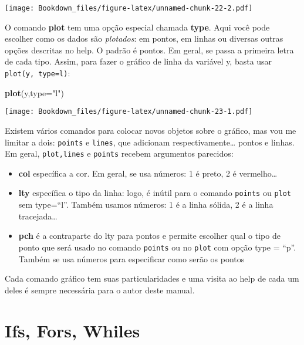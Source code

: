 \documentclass[]{book}
\newenvironment{Shaded}{\begin{snugshade}}{\end{snugshade}}
\newcommand{\KeywordTok}[1]{\textcolor[rgb]{0.13,0.29,0.53}{\textbf{#1}}}
\newcommand{\DataTypeTok}[1]{\textcolor[rgb]{0.13,0.29,0.53}{#1}}
\newcommand{\StringTok}[1]{\textcolor[rgb]{0.31,0.60,0.02}{#1}}
\newcommand{\NormalTok}[1]{#1}
\providecommand{\tightlist}{%
  \setlength{\itemsep}{0pt}\setlength{\parskip}{0pt}}
\begin{document}
\texttt{[image: Bookdown\_files/figure-latex/unnamed-chunk-22-2.pdf]}

O comando \textbf{plot} tem uma opção especial chamada \textbf{type}.
Aqui você pode escolher como os dados são \emph{plotados}: em pontos, em
linhas ou diversas outras opções descritas no help. O padrão é pontos.
Em geral, se passa a primeira letra de cada tipo. Assim, para fazer o
gráfico de linha da variável y, basta usar
\texttt{plot(y,\ type=\textquotesingle{}\textquotesingle{}l\textquotesingle{}\textquotesingle{})}:

\begin{Shaded}
\begin{Highlighting}[]
\KeywordTok{plot}\NormalTok{(y,}\DataTypeTok{type=}\StringTok{"l"}\NormalTok{)}
\end{Highlighting}
\end{Shaded}

\texttt{[image: Bookdown\_files/figure-latex/unnamed-chunk-23-1.pdf]}

Existem vários comandos para colocar novos objetos sobre o gráfico, mas
vou me limitar a dois: \texttt{points} e \texttt{lines}, que adicionam
respectivamente\ldots{} pontos e linhas. Em geral, \texttt{plot,lines} e
\texttt{points} recebem argumentos parecidos:

\begin{itemize}
\tightlist
\item
  \textbf{col} específica a cor. Em geral, se usa números: 1 é preto, 2
  é vermelho\ldots{}
\item
  \textbf{lty} específica o tipo da linha: logo, é inútil para o comando
  \texttt{points} ou \texttt{plot} sem type=``l''. Também usamos
  números: 1 é a linha sólida, 2 é a linha tracejada\ldots{}
\item
  \textbf{pch} é a contraparte do lty para pontos e permite escolher
  qual o tipo de ponto que será usado no comando \texttt{points} ou no
  \texttt{plot} com opção type = ``p''. Também se usa números para
  especificar como serão os pontos
\end{itemize}

Cada comando gráfico tem suas particularidades e uma visita ao help de
cada um deles é sempre necessária para o autor deste manual.

\chapter{Ifs, Fors, Whiles}\label{ifs-fors-whiles}
\end{document}

